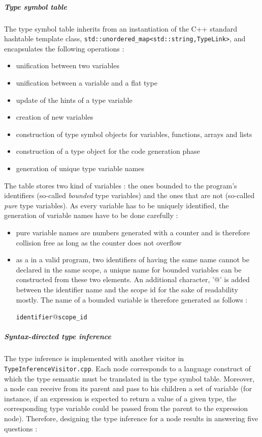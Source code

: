 \documentclass[a4paper,11pt]{article}
\begin{document}
\subparagraph{Type symbol table} The type symbol table inherits from an instantiation of the C++ standard hashtable template class, \texttt{std::unordered\_map<std::string,TypeLink>}, and encapsulates the following operations :
\begin{itemize}
	\item unification between two variables
	\item unification between a variable and a flat type
	\item update of the hints of a type variable
	\item creation of new variables
	\item construction of type symbol objects for variables, functions, arrays and lists
	\item construction of a type object for the code generation phase
	\item generation of unique type variable names
\end{itemize}
The table stores two kind of variables : the ones bounded to the program's identifiers (so-called \textit{bounded} type variables) and the ones that are not (so-called \textit{pure} type variables). As every variable has to be uniquely identified, the generation of variable names have to be done carefully :
\begin{itemize}
	\item pure variable names are numbers generated with a counter and is therefore collision free as long as the counter does not overflow
	\item as a in a valid program, two identifiers of having the same name cannot be declared in the same scope, a unique name for bounded variables can be constructed from these two elements. An additional character, '@' is added between the identifier name and the scope id for the sake of readability mostly. The name of a bounded variable is therefore generated as follows :
	\begin{center}
		\texttt{identifier}@\texttt{scope\_id}
	\end{center}
\end{itemize}
\subparagraph{Syntax-directed type inference} The type inference is implemented with another visitor in \texttt{TypeInferenceVisitor.cpp}. Each node corresponds to a language construct of which the type semantic must be translated in the type symbol table. Moreover, a node can receive from its parent and pass to his children a set of variable (for instance, if an expression is expected to return a value of a given type, the corresponding type variable could be passed from the parent to the expression node). Therefore, designing the type inference for a node results in answering five questions :
\end{document}
